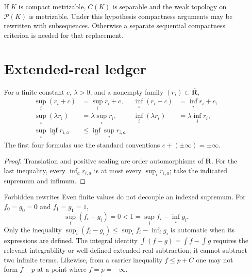 If \(K\) is compact metrizable, \(C(K)\) is separable and the weak topology
on \(\mathcal P(K)\) is metrizable.
Under this hypothesis compactness arguments may be rewritten with
subsequences.  Otherwise a separate sequential compactness criterion is
needed for that replacement.

\section{Extended-real ledger}
\label{sec:appE-extended-ledger}

\begin{proposition}\label{prop:appE-safe-identities}
For a finite constant \(c\), \(\lambda>0\), and a nonempty family
\((r_i)\subset\overline{\mathbf R}\),
\[
\begin{aligned}
 \sup_i(r_i+c)&=\sup_ir_i+c,&
 \inf_i(r_i+c)&=\inf_ir_i+c,\\
 \sup_i(\lambda r_i)&=\lambda\sup_ir_i,&
 \inf_i(\lambda r_i)&=\lambda\inf_ir_i,\\
 \sup_i\inf_a r_{i,a}&\leq\inf_a\sup_i r_{i,a}.
\end{aligned}
\tag{E.13}\label{eq:appE-safe-identities}
\]
The first four formulas use the standard conventions
\(c+(\pm\infty)=\pm\infty\).
\end{proposition}

\begin{proof}
Translation and positive scaling are order automorphisms of
\(\overline{\mathbf R}\).
For the last inequality, every \(\inf_a r_{i,a}\) is at most every
\(\sup_i r_{i,a}\); take the indicated supremum and infimum.
\end{proof}

\noindent\begin{minipage}{\linewidth}
\begin{warning}{Forbidden rewrites}
\label{warn:appE-forbidden-rewrites}
Even finite values do not decouple an indexed supremum.  For
\(f_0=g_0=0\) and \(f_1=g_1=1\),
\[
 \sup_i(f_i-g_i)=0<1=\sup_if_i-\inf_ig_i.
\]
Only the inequality \(\sup_i(f_i-g_i)\leq\sup_i f_i-\inf_i g_i\)
is automatic when its expressions are defined.  The integral identity
\(\int(f-g)=\int f-\int g\) requires the relevant integrability or
well-defined extended-real subtraction; it cannot subtract two infinite
terms.
Likewise, from a carrier inequality \(f\leq p+C\) one may not form
\(f-p\) at a point where \(f=p=-\infty\).
\end{warning}
\end{minipage}\par

